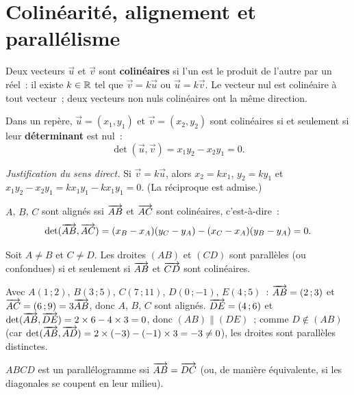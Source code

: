 \section{Colin\'earit\'e, alignement et parall\'elisme}

\begin{defn}
Deux vecteurs $\vec u$ et $\vec v$ sont \textbf{colin\'eaires} si l'un est le
produit de l'autre par un r\'eel~: il existe $k\in\mathbb{R}$ tel que $\vec v=k\vec u$
ou $\vec u=k\vec v$. Le vecteur nul est colin\'eaire \`a tout vecteur~; deux
vecteurs non nuls colin\'eaires ont la m\^eme direction.
\end{defn}

\begin{prop}
Dans un rep\`ere, $\vec{u}=(x_1,y_1)$ et $\vec{v}=(x_2,y_2)$ sont colin\'eaires
si et seulement si leur \textbf{d\'eterminant} est nul~:
$$\det(\vec u,\vec v)=x_1 y_2 - x_2 y_1 = 0.$$
\end{prop}

\noindent\textit{Justification du sens direct.} Si $\vec v=k\vec u$, alors
$x_2=kx_1$, $y_2=ky_1$ et $x_1y_2-x_2y_1=kx_1y_1-kx_1y_1=0$.
(La r\'eciproque est admise.)

\begin{methode}
$A$, $B$, $C$ sont align\'es ssi $\overrightarrow{AB}$ et $\overrightarrow{AC}$ sont colin\'eaires, c'est-\`a-dire~:
$$\det(\overrightarrow{AB}, \overrightarrow{AC})
  = (x_B-x_A)(y_C-y_A) - (x_C-x_A)(y_B-y_A) = 0.$$
\end{methode}

\begin{prop}
Soit $A\ne B$ et $C\ne D$. Les droites $(AB)$ et $(CD)$ sont parall\`eles
(ou confondues) si et seulement si $\overrightarrow{AB}$ et $\overrightarrow{CD}$ sont colin\'eaires.
\end{prop}

\begin{ex}
Avec $A(1\,;2)$, $B(3\,;5)$, $C(7\,;11)$, $D(0\,;-1)$, $E(4\,;5)$~:
$\overrightarrow{AB}=(2\,;3)$ et $\overrightarrow{AC}=(6\,;9)=3\overrightarrow{AB}$, donc $A$, $B$, $C$ sont align\'es.
$\overrightarrow{DE}=(4\,;6)$ et $\det(\overrightarrow{AB},\overrightarrow{DE})=2\times6-4\times3=0$, donc
$(AB)\parallel(DE)$~; comme $D\notin(AB)$ (car $\det(\overrightarrow{AB},\overrightarrow{AD})=2\times(-3)-(-1)\times3=-3\ne0$),
les droites sont parall\`eles distinctes.
\end{ex}

\begin{methode}
$ABCD$ est un parall\'elogramme ssi $\overrightarrow{AB} = \overrightarrow{DC}$
(ou, de mani\`ere \'equivalente, si les diagonales se coupent en leur milieu).
\end{methode}


